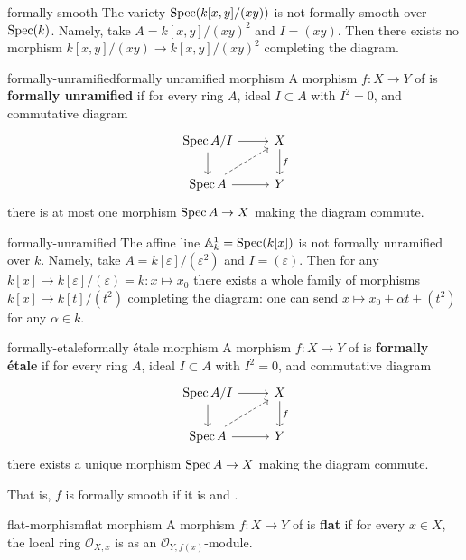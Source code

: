 \begin{example}{formally-smooth}
    The variety $\operatorname{Spec}(k[x, y]/(xy))$ is not formally smooth over $\operatorname{Spec}(k)$. Namely, take $A = k[x, y] / (xy)^2$ and $I = (xy)$. Then there exists no morphism $k[x, y]/(xy) \to k[x, y]/(xy)^2$ completing the diagram.
\end{example}

\begin{topic}{formally-unramified}{formally unramified morphism}
    A morphism $f : X \to Y$ of  is \textbf{formally unramified} if for every ring $A$, ideal $I \subset A$ with $I^2 = 0$, and commutative diagram
    \[ \begin{tikzcd} \Spec A/I \arrow{r} \arrow{d} & X \arrow{d}{f} \\ \Spec A \arrow{r} \arrow[dashed]{ur} & Y \end{tikzcd} \]
    there is at most one morphism $\operatorname{Spec} A \to X$ making the diagram commute.
\end{topic}

\begin{example}{formally-unramified}
    The affine line $\mathbb{A}^1_k = \operatorname{Spec}(k[x])$ is not formally unramified over $k$. Namely, take $A = k[\varepsilon] / (\varepsilon^2)$ and $I = (\varepsilon)$. Then for any $k[x] \to k[\varepsilon]/(\varepsilon) = k : x \mapsto x_0$ there exists a whole family of morphisms $k[x] \to k[t]/(t^2)$ completing the diagram: one can send $x \mapsto x_0 + \alpha t + (t^2)$ for any $\alpha \in k$.
\end{example}

\begin{topic}{formally-etale}{formally étale morphism}
    A morphism $f : X \to Y$ of  is \textbf{formally étale} if for every ring $A$, ideal $I \subset A$ with $I^2 = 0$, and commutative diagram
    \[ \begin{tikzcd} \Spec A/I \arrow{r} \arrow{d} & X \arrow{d}{f} \\ \Spec A \arrow{r} \arrow[dashed]{ur} & Y \end{tikzcd} \]
    there exists a unique morphism $\operatorname{Spec} A \to X$ making the diagram commute.
    
    That is, $f$ is formally smooth if it is  and .
\end{topic}

\begin{topic}{flat-morphism}{flat morphism}
    A morphism $f : X \to Y$ of  is \textbf{flat} if for every $x \in X$, the local ring $\mathcal{O}_{X, x}$ is  as an $\mathcal{O}_{Y, f(x)}$-module.
\end{topic}

